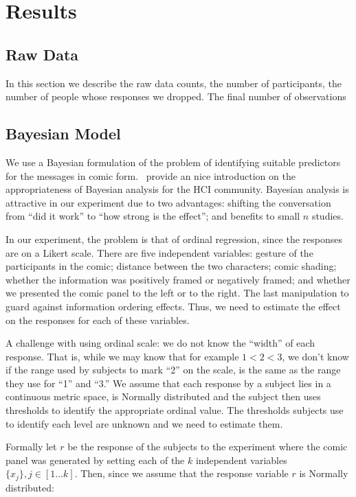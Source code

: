 
\section{Results}
\label{sec:Results}

\subsection{Raw Data}
\label{sub:Raw Data}
In this section we describe the raw data counts, the number of participants, the number of people whose responses we dropped. The final number of observations

\subsection{Bayesian Model}
\label{sub:Bayesian Model}
We use a Bayesian formulation of the problem of identifying suitable predictors for the messages in comic form.~\textcite{Kay2016} provide an nice introduction on the appropriateness of Bayesian analysis for the HCI community. Bayesian analysis is attractive in our experiment due to two advantages: shifting the conversation from ``did it work'' to ``how strong is the effect''; and benefits to small $n$ studies.

In our experiment, the problem is that of ordinal regression, since the responses are on a Likert scale. There are five independent variables: gesture of the participants in the comic;  distance between the two characters; comic shading; whether the information was positively framed or negatively framed; and whether we presented the comic panel to the left or to the right. The last manipulation to guard against information ordering effects. Thus, we need to estimate the effect on the responses for each of these variables.

A challenge with using ordinal scale: we do not know the ``width'' of each response. That is, while we may know that for example $1<2<3$, we don't know if the range used by subjects to mark ``2'' on the scale, is the same as the range they use for ``1'' and ``3.''  We assume that each response by a subject lies in a continuous metric space, is Normally distributed and the subject then uses thresholds to identify the appropriate ordinal value. The thresholds subjects use to identify each level are unknown and we need to estimate them.


Formally let $r$ be the response of the subjects to the experiment where the comic panel was generated by setting each of the $k$ independent variables $\{x_j\}, j \in [1 \ldots k]$. Then, since we assume that the response variable $r$ is Normally distributed:

